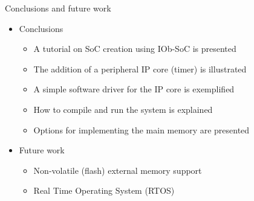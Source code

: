 \documentclass [xcolor=svgnames, t] {beamer}
\begin{document}
\begin{frame}{Conclusions and future work}

\begin{itemize}
  \item Conclusions
    \begin{itemize}
    \item A tutorial on SoC creation using IOb-SoC is presented
    \item The addition of a peripheral IP core (timer) is illustrated
    \item A simple software driver for the IP core is exemplified
    \item How to compile and run the system is explained 
    \item Options for implementing the main memory are presented
    \end{itemize}
  \item Future work
    \begin{itemize}
    \item Non-volatile (flash) external memory support
    \item Real Time Operating System (RTOS) 
    \end{itemize}
\end{itemize}

\end{frame}

\end{document}

